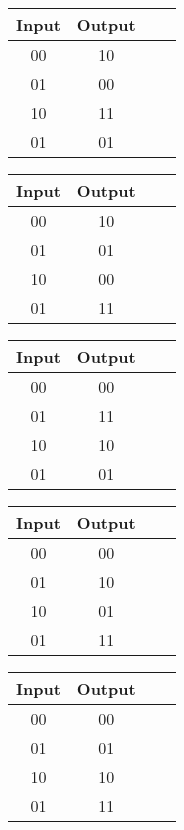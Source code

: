 \documentclass[12pt]{article}
\begin{document}
\begin{center}
\begin{tabular}{|c|c|c|c|}
\hline
Input & Output  \\
\hline
00 & 10 \\
01 & 00 \\
10 & 11 \\
01 & 01 \\
\hline
\end{tabular}
\end{center}

\begin{center}
\begin{tabular}{|c|c|c|c|}
\hline
Input & Output  \\
\hline
00 & 10 \\
01 & 01 \\
10 & 00 \\
01 & 11 \\
\hline
\end{tabular}
\end{center}

\begin{center}
\begin{tabular}{|c|c|c|c|}
\hline
Input & Output  \\
\hline
00 & 00 \\
01 & 11 \\
10 & 10 \\
01 & 01 \\
\hline
\end{tabular}
\end{center}

\begin{center}
\begin{tabular}{|c|c|c|c|}
\hline
Input & Output  \\
\hline
00 & 00 \\
01 & 10 \\
10 & 01 \\
01 & 11 \\
\hline
\end{tabular}
\end{center}

\begin{center}
\begin{tabular}{|c|c|c|c|}
\hline
Input & Output  \\
\hline
00 & 00 \\
01 & 01 \\
10 & 10 \\
01 & 11 \\
\hline
\end{tabular}
\end{center}
\end{document}
